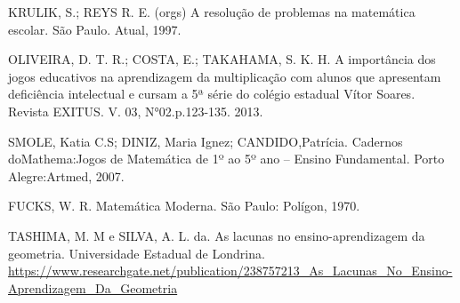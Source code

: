 \documentclass[article,12pt,onesidea,4paper,english,brazil]{abntex2}
\begin{document}
\noindent KRULIK, S.; REYS R. E. (orgs) A resolução de problemas na matemática escolar. São Paulo. Atual, 1997.

\noindent OLIVEIRA, D. T. R.; COSTA, E.; TAKAHAMA, S. K. H. A importância dos jogos educativos na aprendizagem da multiplicação com alunos que apresentam deficiência intelectual e cursam a 5ª série do colégio estadual Vítor Soares. Revista EXITUS. V. 03, N°02.p.123-135. 2013.

\noindent SMOLE, Katia C.S; DINIZ, Maria Ignez; CANDIDO,Patrícia. Cadernos doMathema:Jogos de Matemática de 1º ao 5º ano – Ensino Fundamental. Porto Alegre:Artmed, 2007.

\noindent FUCKS, W. R. Matemática Moderna. São Paulo: Polígon, 1970.

\noindent TASHIMA, M. M e SILVA, A. L. da. As lacunas no ensino-aprendizagem da geometria. Universidade Estadual de Londrina. \url{https://www.researchgate.net/publication/238757213\_As\_Lacunas\_No\_Ensino-Aprendizagem\_Da\_Geometria}
	
\end{document}
